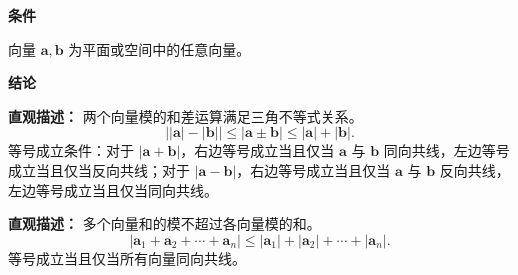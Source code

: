 \begin{statementbox}
	\textbf{\textcolor{CStatement}{条件}}
	\begin{description}[style=nextline, leftmargin=2.8em, labelsep=0.5em, itemsep=0.35em]
		\item[\textbf{\textcolor{CStatement}{条件1（任意向量）}}]
			向量 $\mathbf{a},\mathbf{b}$ 为平面或空间中的任意向量。
	\end{description}

	\medskip
	\textbf{\textcolor{CStatement}{结论}}
	\begin{description}[style=nextline, leftmargin=2.8em, labelsep=0.5em, itemsep=0.45em]
		\item[\textbf{\textcolor{CStatement}{结论一（模三角不等式）}}]
			\textbf{\textcolor{CStatement}{直观描述：}}
			两个向量模的和差运算满足三角不等式关系。
			\[
				\bigl| |\mathbf{a}| - |\mathbf{b}| \bigr| \leq |\mathbf{a} \pm \mathbf{b}| \leq |\mathbf{a}| + |\mathbf{b}|.
			\]
			等号成立条件：对于 $|\mathbf{a}+\mathbf{b}|$，右边等号成立当且仅当 $\mathbf{a}$ 与 $\mathbf{b}$ 同向共线，左边等号成立当且仅当反向共线；对于 $|\mathbf{a}-\mathbf{b}|$，右边等号成立当且仅当 $\mathbf{a}$ 与 $\mathbf{b}$ 反向共线，左边等号成立当且仅当同向共线。

			\medskip
		\item[\textbf{\textcolor{CStatement}{常见变形（多向量模和）}}]
			\textbf{\textcolor{CStatement}{直观描述：}}
			多个向量和的模不超过各向量模的和。
			\[
				|\mathbf{a}_1 + \mathbf{a}_2 + \cdots + \mathbf{a}_n| \le |\mathbf{a}_1| + |\mathbf{a}_2| + \cdots + |\mathbf{a}_n|.
			\]
			等号成立当且仅当所有向量同向共线。
	\end{description}

\end{statementbox}
